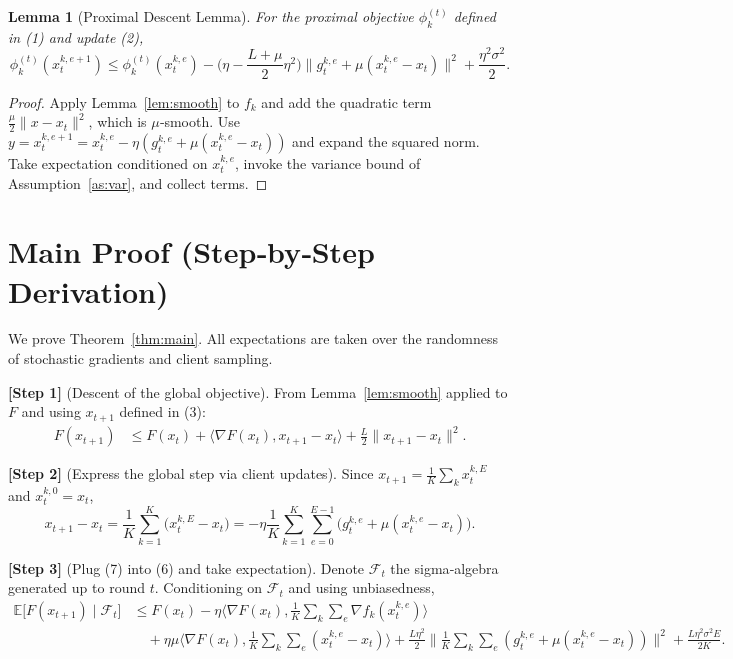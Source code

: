 \documentclass{article}
\newtheorem{lemma}{Lemma}
\begin{document}
\begin{lemma}[Proximal Descent Lemma]\label{lem:prox}
For the proximal objective $\phi_{k}^{(t)}$ defined in (1) and update (2),
\[
\phi_{k}^{(t)}(x_{t}^{k,e+1})
\le\phi_{k}^{(t)}(x_{t}^{k,e})
-\Big(\eta-\frac{L+\mu}{2}\eta^{2}\Big)\big\|g_{t}^{k,e}+\mu(x_{t}^{k,e}-x_t)\big\|^{2}
+\frac{\eta^{2}\sigma^{2}}{2}.
\tag{5}
\]
\end{lemma}
\begin{proof}
Apply Lemma~\ref{lem:smooth} to $f_k$ and add the quadratic term $\frac{\mu}{2}\|x-x_t\|^{2}$, which is $\mu$‑smooth.  
Use $y=x_{t}^{k,e+1}=x_{t}^{k,e}-\eta(g_{t}^{k,e}+\mu(x_{t}^{k,e}-x_t))$ and expand the squared norm.  
Take expectation conditioned on $x_{t}^{k,e}$, invoke the variance bound of Assumption~\ref{as:var}, and collect terms. \qedhere
\end{proof}

\section*{Main Proof (Step‑by‑Step Derivation)}
We prove Theorem~\ref{thm:main}.  All expectations are taken over the randomness of stochastic gradients and client sampling.

\noindent\textbf{[Step 1]} (Descent of the global objective).  
From Lemma~\ref{lem:smooth} applied to $F$ and using $x_{t+1}$ defined in (3):
\[
\begin{aligned}
F(x_{t+1})
&\le F(x_t)+\Big\langle\nabla F(x_t),x_{t+1}-x_t\Big\rangle
   +\frac{L}{2}\|x_{t+1}-x_t\|^{2}. \tag{6}
\end{aligned}
\]

\noindent\textbf{[Step 2]} (Express the global step via client updates).  
Since $x_{t+1}=\frac{1}{K}\sum_{k}x_{t}^{k,E}$ and $x_{t}^{k,0}=x_t$,
\[
x_{t+1}-x_t=\frac{1}{K}\sum_{k=1}^{K}\big(x_{t}^{k,E}-x_t\big)
           =-\eta\frac{1}{K}\sum_{k=1}^{K}\sum_{e=0}^{E-1}\big(g_{t}^{k,e}+\mu(x_{t}^{k,e}-x_t)\big). \tag{7}
\]

\noindent\textbf{[Step 3]} (Plug (7) into (6) and take expectation).  
Denote $\mathcal{F}_t$ the sigma‑algebra generated up to round $t$.  Conditioning on $\mathcal{F}_t$ and using unbiasedness,
\[
\begin{aligned}
\mathbb{E}\big[F(x_{t+1})\mid\mathcal{F}_t\big]
&\le F(x_t)-\eta\Big\langle\nabla F(x_t),
     \frac{1}{K}\sum_{k}\sum_{e}\nabla f_k(x_{t}^{k,e})\Big\rangle \\
&\quad +\eta\mu\Big\langle\nabla F(x_t),
     \frac{1}{K}\sum_{k}\sum_{e}(x_{t}^{k,e}-x_t)\Big\rangle
   +\frac{L\eta^{2}}{2}\Big\|\frac{1}{K}\sum_{k}\sum_{e}(g_{t}^{k,e}+\mu(x_{t}^{k,e}-x_t))\Big\|^{2}
   +\frac{L\eta^{2}\sigma^{2}E}{2K}. \tag{8}
\end{aligned}
\]
\end{document}
